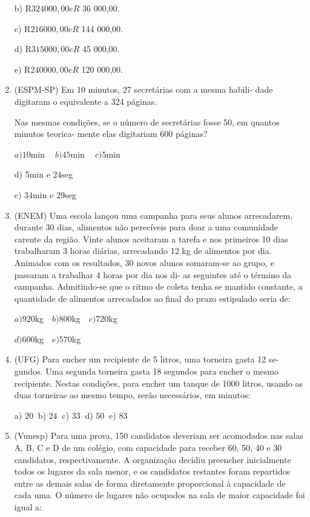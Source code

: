 \begin{multicols*}{2}
\begin{enumerate}
b)	  R$ 324 000,00 e R$ 36 000,00.

c)	  R$ 216 000,00 e R$ 144 000,00.

d)	  R$ 315 000,00 e R$ 45 000,00.

e)	  R$ 240 000,00 e R$ 120 000,00.

		\item (ESPM-SP) Em 10 minutos, 27 secretárias com a mesma habili- dade digitaram o equivalente a 324 páginas. 
		
		Nas mesmas condições, se o número de secretárias fosse 50, em quantos minutos teorica- mente elas digitariam 600 páginas?

$ a) 10$min $\ \ \ \ b) 45$min $\ \ \ \ c) 5$min

d) 5min e 24seg

e) 34min e 29seg

		\item (ENEM) Uma escola lançou uma campanha para seus alunos arrecadarem, durante 30 dias, alimentos não perecíveis para doar a uma comunidade carente da região. Vinte alunos aceitaram a tarefa e nos primeiros 10 dias trabalharam 3 horas diárias, arrecadando 12 kg de alimentos por dia. Animados com os resultados, 30 novos alunos somaram-se ao grupo, e passaram a trabalhar 4 horas por dia nos di- as seguintes até o término da campanha. Admitindo-se que o ritmo de coleta tenha se mantido constante, a quantidade de alimentos arrecadados ao final do prazo estipulado seria de:

$a)920$kg $ \ \ \ b)800$kg $ \ \ \ c)720$kg

$d)600$kg $ \ \ \ e)570$kg
		
		\item (UFG) Para encher um recipiente de 5 litros, uma torneira gasta 12 se- gundos. Uma segunda torneira gasta 18 segundos para encher o mesmo recipiente. Nestas condições, para encher um tanque de 1000 litros, usando as duas torneiras ao mesmo tempo, serão necessários, em minutos:

		a) $20 \ $ b) $24 \ $ c) $33 \ $ d) $50 \ $ e) $83 $

		\item (Vunesp) Para uma prova, 150 candidatos deveriam ser acomodados nas salas A, B, C e D de um colégio, com capacidade para receber 60, 50, 40 e 30 candidatos, respectivamente. A organização decidiu preencher inicialmente todos os lugares da sala menor, e os candidatos restantes foram repartidos entre as demais salas de forma diretamente proporcional à capacidade de cada uma. O número de lugares não ocupados na sala de maior capacidade foi igual a:


\end{enumerate}
\end{multicols*}
